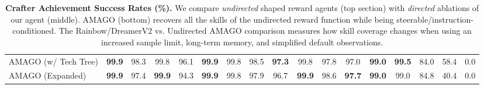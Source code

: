 \documentclass{article}
\begin{document}
\begin{table}[ht]
{\begin{tabular}{@{}lcccccccccccccccc@{}}
AMAGO (w/ Tech Tree) & \textbf{99.9}                                           & 98.3                                                     & 99.8                                                   & 96.1                                               & \textbf{99.9}                                          & 99.8                                                  & 98.5                                               & \textbf{97.3}                                            & 99.8                                                    & 97.8                                                     & 97.0                                                     & \textbf{99.0}                                            & \textbf{99.5}                                          & 84.0                                                    & 58.4                                                       & 0.0                                                              \\
AMAGO (Expanded)     & \textbf{99.9}                                           & 97.4                                                     & \textbf{99.9}                                          & 94.3                                               & \textbf{99.9}                                          & 99.8                                                  & 97.9                                               & 96.7                                                     & \textbf{99.9}                                           & 98.6                                                     & \textbf{97.7}                                            & \textbf{99.0}                                            & 99.0                                                   & 84.8                                                    & 40.4                                                       & 0.0                                                              \\ \bottomrule
\end{tabular}}
\caption{\textbf{Crafter Achievement Success Rates (\%).} We compare \textit{undirected} shaped reward agents (top section) with \textit{directed} ablations of our agent (middle). AMAGO (bottom) recovers all the skills of the undirected reward function while being steerable/instruction-conditioned. The Rainbow/DreamerV2 vs. Undirected AMAGO comparison measures how skill coverage changes when using an increased sample limit, long-term memory, and simplified default observations.}
\label{tbl:crafter}
\end{table}
\end{document}
